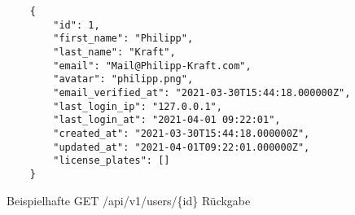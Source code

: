 \begin{listing}[H]
  \begin{verbatim}
    {
        "id": 1,
        "first_name": "Philipp",
        "last_name": "Kraft",
        "email": "Mail@Philipp-Kraft.com",
        "avatar": "philipp.png",
        "email_verified_at": "2021-03-30T15:44:18.000000Z",
        "last_login_ip": "127.0.0.1",
        "last_login_at": "2021-04-01 09:22:01",
        "created_at": "2021-03-30T15:44:18.000000Z",
        "updated_at": "2021-04-01T09:22:01.000000Z",
        "license_plates": []
    }
  \end{verbatim}
  \caption{Beispielhafte GET /api/v1/users/\{id\} Rückgabe}
\end{listing}
